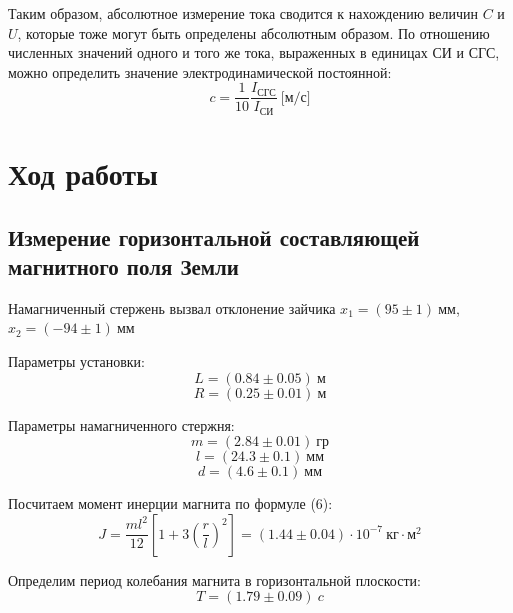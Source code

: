 \documentclass[a4paper]{article}
\begin{document}
Таким образом, абсолютное измерение тока сводится к нахождению величин $C$ и $U$,
которые тоже могут быть определены абсолютным образом.
По отношению численных значений одного и того же тока, выраженных в единицах СИ и СГС,
можно определить значение электродинамической постоянной:
\begin{equation}
    c = \frac{1}{10} \frac{I_\text{СГС}}{I_\text{СИ}} \ \text{[м/с]}
\end{equation}

\section{Ход работы}

\subsection{Измерение горизонтальной составляющей магнитного поля Земли}

Намагниченный стержень вызвал отклонение зайчика $x_1 = (95 \pm 1)~\text{мм}$, $x_2 = (-94 \pm 1)~\text{мм}$

\noindent Параметры установки:
\begin{equation*}
    L = (0.84 \pm 0.05)~\text{м}
\end{equation*}
\begin{equation*}
    R = (0.25 \pm 0.01)~\text{м}
\end{equation*}

\noindent Параметры намагниченного стержня:
\begin{equation*}
    m = (2.84 \pm 0.01)~\text{гр}
\end{equation*}
\begin{equation*}
    l = (24.3 \pm 0.1)~\text{мм}
\end{equation*}
\begin{equation*}
    d = (4.6 \pm 0.1)~\text{мм}
\end{equation*}

\noindent Посчитаем момент инерции магнита по формуле (6):
\begin{equation*}
    J = \frac{ml^2}{12} \left[ 1 + 3\left(\frac{r}{l}\right)^2\right] = (1.44 \pm 0.04) \cdot 10^{-7}~\text{кг}\cdot\text{м}^2
\end{equation*}

\noindent Определим период колебания магнита в горизонтальной плоскости:
\begin{equation*}
    T = (1.79 \pm 0.09) ~c
\end{equation*}
\end{document}
